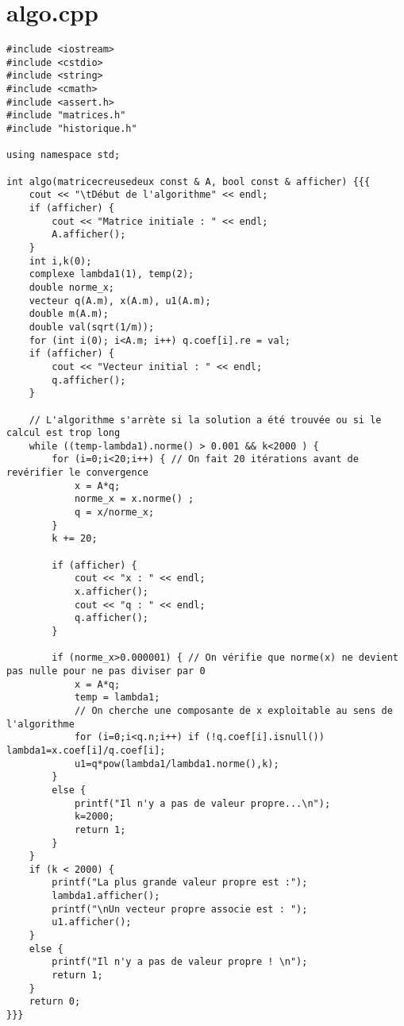 \documentclass[a4paper]{article}
\begin{document}
\section{algo.cpp}
\begin{verbatim}
#include <iostream>
#include <cstdio>
#include <string>
#include <cmath>
#include <assert.h>
#include "matrices.h"
#include "historique.h"

using namespace std;

int algo(matricecreusedeux const & A, bool const & afficher) {{{
    cout << "\tDébut de l'algorithme" << endl;
    if (afficher) {
        cout << "Matrice initiale : " << endl;
        A.afficher();
    }
	int i,k(0);
    complexe lambda1(1), temp(2);
    double norme_x;
    vecteur q(A.m), x(A.m), u1(A.m);
    double m(A.m);
    double val(sqrt(1/m));
    for (int i(0); i<A.m; i++) q.coef[i].re = val; 
    if (afficher) {
        cout << "Vecteur initial : " << endl;
        q.afficher();
    }

    // L'algorithme s'arrète si la solution a été trouvée ou si le calcul est trop long
    while ((temp-lambda1).norme() > 0.001 && k<2000 ) {
        for (i=0;i<20;i++) { // On fait 20 itérations avant de revérifier le convergence
            x = A*q;
            norme_x = x.norme() ;
            q = x/norme_x;
        }
        k += 20;

        if (afficher) {
            cout << "x : " << endl;
            x.afficher();
            cout << "q : " << endl;
            q.afficher();
        }

        if (norme_x>0.000001) { // On vérifie que norme(x) ne devient pas nulle pour ne pas diviser par 0
            x = A*q;
            temp = lambda1;
            // On cherche une composante de x exploitable au sens de l'algorithme
            for (i=0;i<q.n;i++) if (!q.coef[i].isnull()) lambda1=x.coef[i]/q.coef[i];
            u1=q*pow(lambda1/lambda1.norme(),k);
        }
        else {
            printf("Il n'y a pas de valeur propre...\n");
            k=2000;
            return 1;
        }
    }
    if (k < 2000) {
        printf("La plus grande valeur propre est :");
        lambda1.afficher();
        printf("\nUn vecteur propre associe est : ");
        u1.afficher();
    }
    else {
        printf("Il n'y a pas de valeur propre ! \n");
        return 1;
    }
    return 0;
}}}
\end{verbatim}
\end{document}
